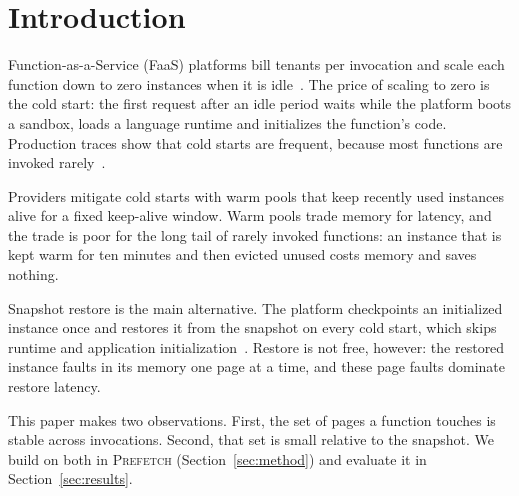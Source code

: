 \section{Introduction}
\label{sec:intro}

Function-as-a-Service (FaaS) platforms bill tenants per invocation and scale
each function down to zero instances when it is idle~\cite{jonas2019cloud}.
The price of scaling to zero is the cold start: the first request after an idle
period waits while the platform boots a sandbox, loads a language runtime and
initializes the function's code. Production traces show that cold starts are
frequent, because most functions are invoked rarely~\cite{shahrad2020serverless}.

Providers mitigate cold starts with warm pools that keep recently used instances
alive for a fixed keep-alive window. Warm pools trade memory for latency, and the
trade is poor for the long tail of rarely invoked functions: an instance that is
kept warm for ten minutes and then evicted unused costs memory and saves nothing.

Snapshot restore is the main alternative. The platform checkpoints an initialized
instance once and restores it from the snapshot on every cold start, which skips
runtime and application initialization~\cite{ustiugov2021benchmarking}. Restore
is not free, however: the restored instance faults in its memory one page at a
time, and these page faults dominate restore latency.

This paper makes two observations. First, the set of pages a function touches is
stable across invocations. Second, that set is small relative to the snapshot.
We build on both in \textsc{Prefetch} (Section~\ref{sec:method}) and evaluate it
in Section~\ref{sec:results}.
